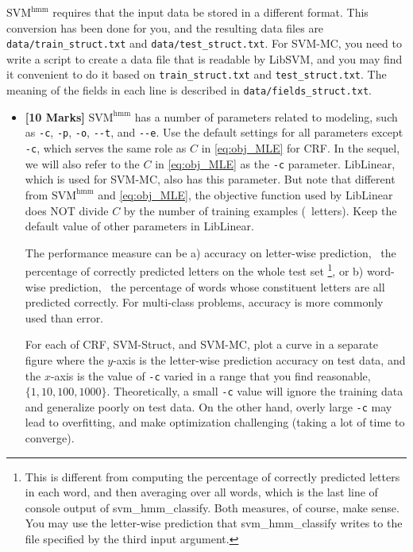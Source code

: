 \documentclass[11pt]{report}
\begin{document}
$\text{SVM}^{\text{hmm}}$ requires that the input data be stored in a different format.
This conversion has been done for you, and the resulting data files are \verb#data/train_struct.txt# and \verb#data/test_struct.txt#.
For SVM-MC, you need to write a script to create a data file that is readable by LibSVM,
and you may find it convenient to do it based on \verb#train_struct.txt# and \verb#test_struct.txt#.
The meaning of the fields in each line is described in \verb#data/fields_struct.txt#.




\begin{itemize}
	\item[(3a)] {\bf [10 Marks]} $\text{SVM}^{\text{hmm}}$ has a number of parameters related to modeling, such as \verb#-c#, \verb#-p#, \verb#-o#, \verb#--t#, and \verb#--e#.
	Use the default settings for all parameters except \verb#-c#,
	which serves the same role as $C$ in \eqref{eq:obj_MLE} for CRF.
	In the sequel, we will also refer to the $C$ in \eqref{eq:obj_MLE} as the \verb#-c# parameter.
	LibLinear, which is used for SVM-MC, also has this parameter.
	But note that different from $\text{SVM}^{\text{hmm}}$ and \eqref{eq:obj_MLE}, the objective function used by LibLinear does NOT divide $C$ by the number of training examples (\ie\ letters).
	Keep the default value of other parameters in LibLinear.
	
	The performance measure can be a) accuracy on letter-wise prediction, \ie\ the percentage of correctly predicted letters on the whole test set%
	\footnote{This is different from computing the percentage of correctly predicted letters in each word, and then averaging over all words, which is the last line of console output of \textsf{svm\_hmm\_classify}.  Both measures, of course, make sense.
		You may use the letter-wise prediction that \textsf{svm\_hmm\_classify} writes to the file specified by the third input argument.},
	or b) word-wise prediction, \ie\ the percentage of words whose constituent letters are all predicted correctly.
	For multi-class problems, accuracy is more commonly used than error.
	
	For each of CRF, SVM-Struct, and SVM-MC,
	plot a curve in a separate figure where the $y$-axis is the letter-wise prediction accuracy on test data,
	and the $x$-axis is the value of \verb#-c# varied in a range that you find reasonable,
	\eg\ $\{1, 10, 100, 1000\}$.
	Theoretically, a small \verb#-c# value will ignore the training data and generalize poorly on test data.
	On the other hand, overly large \verb#-c# may lead to overfitting, and make optimization challenging (taking a lot of time to converge).
	

\end{itemize}
\end{document}
